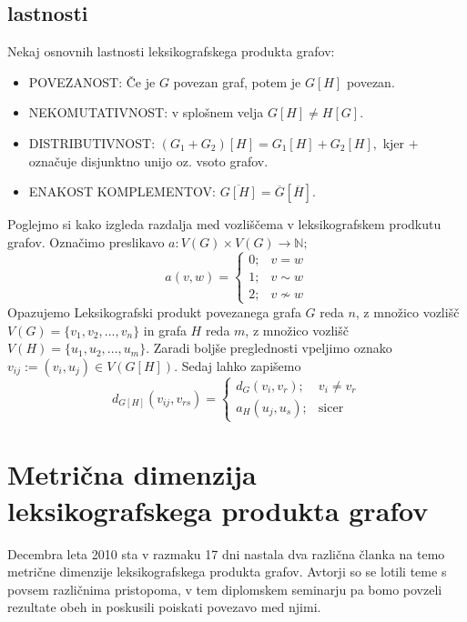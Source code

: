 \documentclass[mat1, tisk]{fmfdelo}
\begin{document}
\subsection{lastnosti}
Nekaj osnovnih lastnosti leksikografskega produkta grafov:
\begin{itemize}
    \item POVEZANOST: Če je $G$ povezan graf, potem je $G[H]$ povezan. 
    \item NEKOMUTATIVNOST: v splošnem velja $G[H] \neq H[G].$
    \item DISTRIBUTIVNOST: $(G_1 + G_2)[H] = G_1[H] + G_2[H],$ kjer $+$ označuje disjunktno unijo oz. vsoto grafov.
    \item ENAKOST KOMPLEMENTOV: $\overline{G[H]} = \overline{G} [\overline{H}].$
\end{itemize}

Poglejmo si kako izgleda razdalja med vozliščema v leksikografskem prodkutu grafov. 
Označimo preslikavo  $a: V(G) \times V(G) \rightarrow \mathbb{N};$   
$$ a(v, w) = \begin{cases}
    0; & v = w \\
    1; & v \sim w \\
    2; & v \not\sim w
\end{cases} 
$$ 
Opazujemo Leksikografski produkt povezanega grafa $G$ reda $n$, z množico vozlišč
$V(G) = \{v_1, v_2, ... , v_n \}$ in grafa $H$ reda $m$, z množico vozlišč 
$V(H) = \{u_1, u_2, ... , u_m \}$. Zaradi boljše preglednosti vpeljimo oznako $v_{ij} := (v_i, u_j) \in V(G[H]).$
Sedaj lahko zapišemo
$$
d_{G[H]}(v_{ij}, v_{rs}) = \begin{cases}
        d_G(v_i, v_r); & v_i \neq v_r \\
        a_H(u_j, u_s); & \text{sicer}
    \end{cases}
$$ 

\section{Metrična dimenzija leksikografskega produkta grafov}
Decembra leta 2010 sta v razmaku 17 dni nastala dva različna članka na temo metrične 
dimenzije leksikografskega produkta grafov. Avtorji so se lotili teme s povsem različnima 
pristopoma, v tem diplomskem seminarju pa bomo povzeli rezultate obeh in 
poskusili poiskati povezavo med njimi. 
\end{document}

